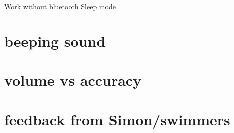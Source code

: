 Work without bluetooth
Sleep mode
\section{beeping sound}

\section{volume vs accuracy}

\section{feedback from Simon/swimmers}


